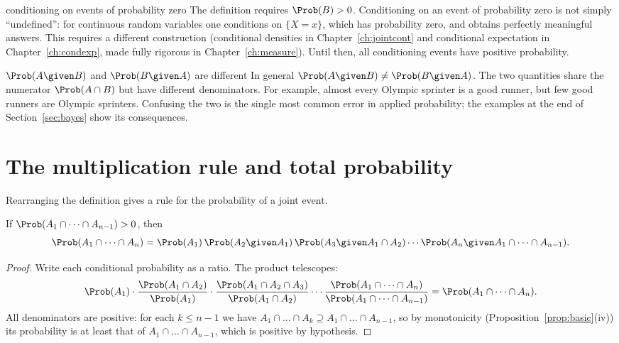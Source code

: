 \begin{nuance}{conditioning on events of probability zero}
The definition requires $\Prob(B)>0$. Conditioning on an event of probability
zero is not simply ``undefined'': for continuous random variables one
conditions on $\{X=x\}$, which has probability zero, and obtains perfectly
meaningful answers. This requires a different construction (conditional
densities in Chapter~\ref{ch:jointcont} and conditional expectation in
Chapter~\ref{ch:condexp}, made fully rigorous in Chapter~\ref{ch:measure}). Until then, all conditioning events have positive
probability.
\end{nuance}

\begin{pitfall}{$\Prob(A\given B)$ and $\Prob(B\given A)$ are different}
In general $\Prob(A\given B)\ne\Prob(B\given A)$. The two quantities share the
numerator $\Prob(A\cap B)$ but have different denominators. For example, almost
every Olympic sprinter is a good runner, but few good runners are Olympic
sprinters. Confusing the two is the single most common error in applied
probability; the examples at the end of Section~\ref{sec:bayes} show its
consequences.
\end{pitfall}

\section{The multiplication rule and total probability}

Rearranging the definition gives a rule for the probability of a joint event.

\begin{theorem}\label{thm:chain}
If $\Prob(A_1\cap\dots\cap A_{n-1})>0$, then
\[
\Prob(A_1\cap\dots\cap A_n)
=\Prob(A_1)\,\Prob(A_2\given A_1)\,\Prob(A_3\given A_1\cap A_2)\cdots
\Prob(A_n\given A_1\cap\dots\cap A_{n-1}).
\]
\end{theorem}
\begin{proof}
Write each conditional probability as a ratio. The product telescopes:
\[
\Prob(A_1)\cdot\frac{\Prob(A_1\cap A_2)}{\Prob(A_1)}\cdot
\frac{\Prob(A_1\cap A_2\cap A_3)}{\Prob(A_1\cap A_2)}\cdots
\frac{\Prob(A_1\cap\dots\cap A_n)}{\Prob(A_1\cap\dots\cap A_{n-1})}
=\Prob(A_1\cap\dots\cap A_n).
\]
All denominators are positive: for each $k\le n-1$ we have
$A_1\cap\dots\cap A_k\supseteq A_1\cap\dots\cap A_{n-1}$, so by monotonicity
(Proposition~\ref{prop:basic}(iv)) its probability is at least that of
$A_1\cap\dots\cap A_{n-1}$, which is positive by hypothesis.
\end{proof}

